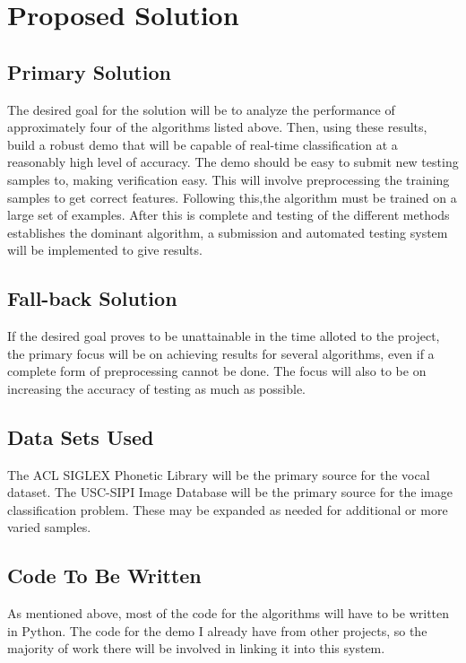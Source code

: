 \documentclass[paper=a4, fontsize=11pt]{scrartcl} %
\numberwithin{equation}{section} %
\numberwithin{figure}{section} %
\numberwithin{table}{section} %
\begin{document}
	
	
	\section{Proposed Solution}
	\subsection{Primary Solution}
	The desired goal for the solution will be to analyze the performance of approximately four of the algorithms listed above. Then, using these results, build a robust demo that will be capable of real-time classification at a reasonably high level of accuracy. The demo should be easy to submit new testing samples to, making verification easy. This will involve preprocessing the training samples to get correct features. Following this,the algorithm must be trained on a large set of examples. After this is complete and testing of the different methods establishes the dominant algorithm, a submission and automated testing system will be implemented to give results.
	
	\subsection{Fall-back Solution}
	If the desired goal proves to be unattainable in the time alloted to the project, the primary focus will be on achieving results  for several algorithms, even if a complete form of preprocessing cannot be done. The focus will also to be on increasing the accuracy of testing as much as possible.
	
	\subsection{Data Sets Used}
	The ACL SIGLEX Phonetic Library will be the primary source for the vocal dataset. The USC-SIPI Image Database will be the primary source for the image classification problem. These may be expanded as needed for additional or more varied samples.
	
	\subsection{Code To Be Written}
	As mentioned above, most of the code for the algorithms will have to be written in Python. The code for the demo I already have from other projects, so the majority of work there will be involved in linking it into this system.
	
\end{document}
